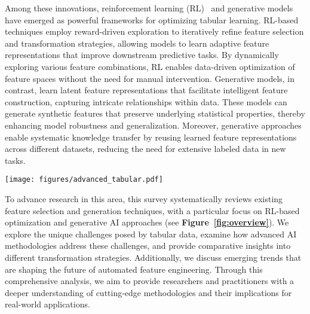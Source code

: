 Among these innovations, reinforcement learning (RL)~\cite{sutton2018reinforcement} and generative models~\cite{ruthotto2021introduction} have emerged as powerful frameworks for optimizing tabular learning. RL-based techniques employ reward-driven exploration to iteratively refine feature selection and transformation strategies, allowing models to learn adaptive feature representations that improve downstream predictive tasks. By dynamically exploring various feature combinations, RL enables data-driven optimization of feature spaces without the need for manual intervention. Generative models, in contrast, learn latent feature representations that facilitate intelligent feature construction, capturing intricate relationships within data. These models can generate synthetic features that preserve underlying statistical properties, thereby enhancing model robustness and generalization. Moreover, generative approaches enable systematic knowledge transfer by reusing learned feature representations across different datasets, reducing the need for extensive labeled data in new tasks.
\begin{figure*}[t]
    \centering
\texttt{[image: figures/advanced\_tabular.pdf]}
    \vspace{-0.5cm}
    \caption{A taxonomy overview of RL-based and generative techniques in tabular data-centric AI.}
    \label{fig:overview}
    \vspace{-0.5cm}
\end{figure*}

To advance research in this area, this survey systematically reviews existing feature selection and generation techniques, with a particular focus on RL-based optimization and generative AI approaches (see \textbf{Figure~\ref{fig:overview}}). We explore the unique challenges posed by tabular data, examine how advanced AI methodologies address these challenges, and provide comparative insights into different transformation strategies. Additionally, we discuss emerging trends that are shaping the future of automated feature engineering. Through this comprehensive analysis, we aim to provide researchers and practitioners with a deeper understanding of cutting-edge methodologies and their implications for real-world applications.